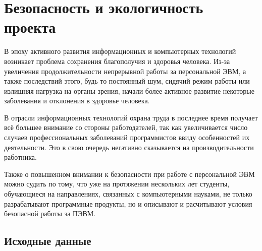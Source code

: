 \section{Безопасность и экологичность проекта}

В эпоху активного развития информационных и компьютерных технологий возникает проблема сохранения благополучия и здоровья человека.
Из-за увеличения продолжительности непрерывной работы за персональной ЭВМ, а также последствий этого, будь то постоянный шум, сидячий режим работы или излишняя нагрузка на органы зрения, начали более активное развитие некоторые заболевания и отклонения в здоровье человека.

В отрасли информационных технологий охрана труда в последнее время получает всё большее внимание со стороны работодателей, так как увеличивается число случаев профессиональных заболеваний программистов ввиду особенностей их деятельности.
Это в свою очередь негативно сказывается на производительности работника.

Также о повышенном внимании к безопасности при работе с персональной ЭВМ можно судить по тому, что уже на протяжении нескольких лет студенты, обучающиеся на направлениях, связанных с компьютерными науками, не только разрабатывают программные продукты, но и описывают и расчитывают условия безопасной работы за ПЭВМ.

\subsection{Исходные данные}

